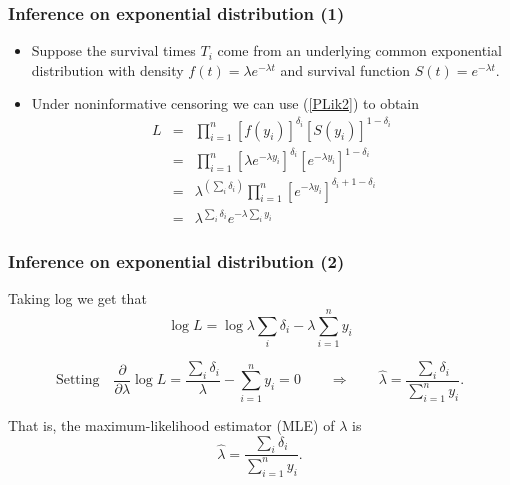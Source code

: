 \documentclass{beamer}
\begin{document}
\begin{frame} \frametitle{Inference  on exponential distribution (1)}

\begin{itemize}

\item Suppose the survival times $T_i$ come from an underlying common exponential distribution with density $f(t) = \lambda e^{-\lambda t}$ and survival function $S(t) = e^{-\lambda t}$.


\item 
Under noninformative censoring we can use (\ref{PLik2}) to obtain
\begin{eqnarray*} L &=& \prod_{i=1}^n[f(y_i)]^{\delta_i} [
  S(y_i)]^{1-\delta_i}\\&=& \prod_{i=1}^n[\lambda e^{-\lambda
    y_i}]^{\delta_i} [
  e^{-\lambda y_i}]^{1-\delta_i}\\
  &=& \lambda^{(\sum_i\delta_i)} \prod_{i=1}^n[ e^{-\lambda
    y_i}]^{\delta_i+1-\delta_i}\\
  &=& \lambda^{\sum_i \delta_i}e^{-\lambda\sum_iy_i}
\end{eqnarray*}

\end{itemize}
\end{frame}


\begin{frame} \frametitle{Inference on exponential distribution (2)}

Taking log we get that
\[
\log L =  \log \lambda{\sum_i \delta_i}  - \lambda \sum_{i=1}^n y_i 
 \]

\vspace{0.1cm}
\[
\text{Setting} \quad  \frac{\partial}{\partial \lambda} \log L = \frac {\sum_i \delta_i}{\lambda} - \sum_{i=1}^n
y_i = 0 \qquad \Rightarrow \qquad \hat{\lambda} = \frac {\sum_i \delta_i}{\sum_{i=1}^n
  y_i}.\]

\vspace{0.2cm} That is, the maximum-likelihood estimator (MLE) of
$\lambda$ is
\[ \hat{\lambda} = \frac {\sum_i \delta_i}{\sum_{i=1}^n y_i}.\] 

\end{frame}
\end{document}

